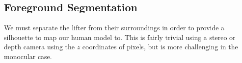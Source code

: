 \subsection{Foreground Segmentation}

We must separate the lifter from their surroundings in order to provide a silhouette to map our human model to. This is fairly trivial using a stereo or depth camera using the $z$ coordinates of pixels, but is more challenging in the monocular case.



